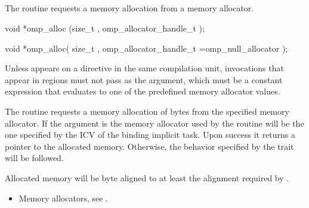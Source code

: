 \begin{ccppspecific}

\subsection{}
\label{subsec:omp_alloc}

\summary
The  routine requests a memory allocation from a memory allocator.

\format
\begin{cspecific}
\begin{ompcFunction}
void *omp_alloc (size_t , omp_allocator_handle_t );
\end{ompcFunction}
\end{cspecific}
\begin{cppspecific}

\begin{ompcFunction}
void *omp_alloc(
  size_t ,
  omp_allocator_handle_t =omp_null_allocator
);
\end{ompcFunction}
\end{cppspecific}

\constraints
Unless  appears on a  directive in the
same compilation unit,  invocations that appear in  
regions must not pass  as the  argument, 
which must be a constant expression that evaluates to one of the predefined memory 
allocator values.

\effect
The  routine requests a memory allocation of  
bytes from the specified memory allocator. If the  argument 
is  the memory allocator used by the routine will 
be the one specified by the  ICV of the binding 
implicit task. Upon success it returns a pointer to the allocated memory. 
Otherwise, the behavior specified by the  trait will be followed.

Allocated memory will be byte aligned to at least the alignment required by .

\crossreferences
\begin{itemize}
\item Memory allocators, see .
\end{itemize}




\end{ccppspecific}

